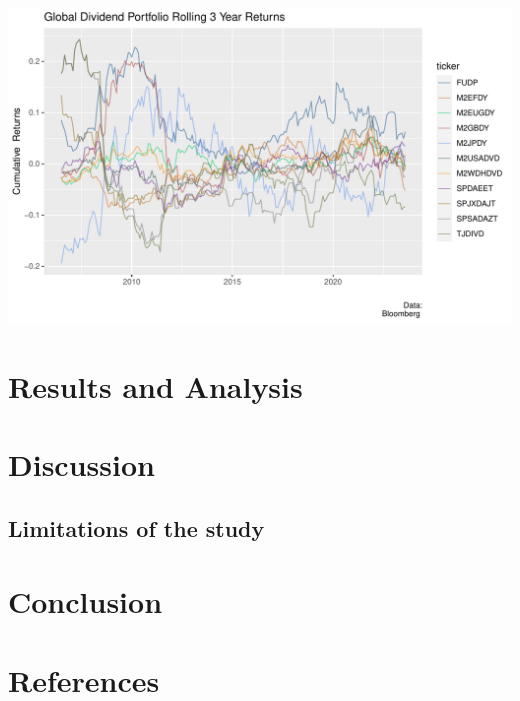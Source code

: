 \documentclass[12pt,preprint, authoryear]{elsarticle}
\let\origfigure\figure
\let\endorigfigure\endfigure
\renewenvironment{figure}[1][2] {
    \expandafter\origfigure\expandafter[H]
} {
    \endorigfigure
}
\numberwithin{equation}{section}
\numberwithin{figure}{section}
\numberwithin{table}{section}
\begin{document}
\begin{figure}[H]

\includegraphics{ThesisWriteUp_files/figure-latex/Figure2-1} \hfill{}

\caption{Rolling 3 Year Returns \label{Fig2}}\label{fig:Figure2}
\end{figure}

\hypertarget{results-and-analysis}{%
\section{Results and Analysis}\label{results-and-analysis}}

\hypertarget{discussion}{%
\section{Discussion}\label{discussion}}

\hypertarget{limitations-of-the-study}{%
\subsection{Limitations of the study}\label{limitations-of-the-study}}

\hypertarget{conclusion}{%
\section{Conclusion}\label{conclusion}}

\newpage

\hypertarget{references}{%
\section*{References}\label{references}}
\end{document}
